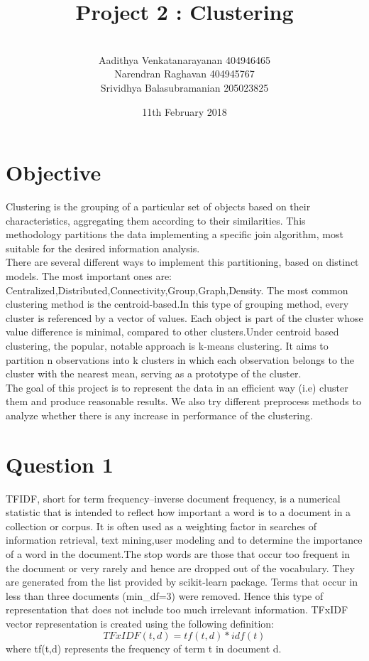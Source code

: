 \documentclass{article}
\title{Project 2 : Clustering}
\author{\\Aadithya Venkatanarayanan 404946465\\Narendran Raghavan 404945767\\Srividhya Balasubramanian 205023825}
\date{11th February 2018}
\begin{document}
\maketitle
\section{Objective}
Clustering is the grouping of a particular set of objects based on their characteristics, aggregating them according to their similarities. This methodology partitions the data implementing a specific join algorithm, most suitable for the desired information analysis. \\
There are several different ways to implement this partitioning, based on distinct models. The most important ones are: Centralized,Distributed,Connectivity,Group,Graph,Density. The most common clustering method is the centroid-based.In this type of grouping method, every cluster is referenced by a vector of values. Each object is part of the cluster whose value difference is minimal, compared to other clusters.Under centroid based clustering, the popular, notable approach is k-means clustering. It aims to partition n observations into k clusters in which each observation belongs to the cluster with the nearest mean, serving as a prototype of the cluster.\\
The goal of this project is to represent the data in an efficient way (i.e) cluster them and produce reasonable results. We also try different preprocess methods to analyze whether there is any increase in performance of the clustering. \\
\section{Question 1}
TFIDF, short for term frequency–inverse document frequency, is a numerical statistic that is intended to reflect how important a word is to a document in a collection or corpus. It is often used as a weighting factor in searches of information retrieval, text mining,user modeling and to determine the importance of a word in the document.The stop words are those that occur too frequent in the document or very rarely and hence are dropped out of the vocabulary. They are generated from the list provided by scikit-learn package. Terms that occur in less than three documents (min\_df=3) were removed. Hence this type of representation that does not include too much irrelevant information. TFxIDF vector representation is created using the following definition: 
$$ TFxIDF(t,d) = tf(t,d) * idf (t) $$ 
where tf(t,d) represents the frequency of term t in document d.\\
\end{document}
